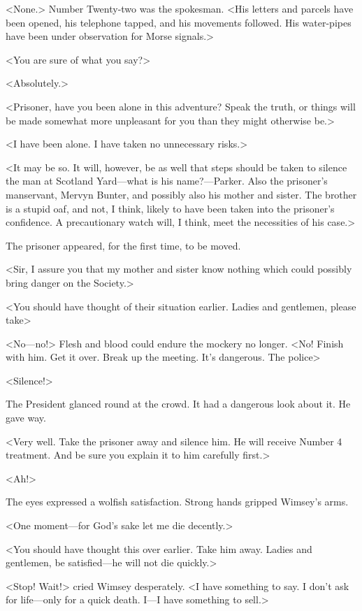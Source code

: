 <None.> Number Twenty-two was the spokesman. <His letters and parcels have been opened, his telephone tapped, and his movements followed. His water-pipes have been under observation for Morse signals.>

<You are sure of what you say?>

<Absolutely.>

<Prisoner, have you been alone in this adventure? Speak the truth, or things will be made somewhat more unpleasant for you than they might otherwise be.>

<I have been alone. I have taken no unnecessary risks.>

<It may be so. It will, however, be as well that steps should be taken to silence the man at Scotland Yard—what is his name?—Parker. Also the prisoner's manservant, Mervyn Bunter, and possibly also his mother and sister. The brother is a stupid oaf, and not, I think, likely to have been taken into the prisoner's confidence. A precautionary watch will, I think, meet the necessities of his case.>

The prisoner appeared, for the first time, to be moved.

<Sir, I assure you that my mother and sister know nothing which could possibly bring danger on the Society.>

<You should have thought of their situation earlier. Ladies and gentlemen, please take\longdash>

<No—no!> Flesh and blood could endure the mockery no longer. <No! Finish with him. Get it over. Break up the meeting. It's dangerous. The police\longdash>

<Silence!>

The President glanced round at the crowd. It had a dangerous look about it. He gave way.

<Very well. Take the prisoner away and silence him. He will receive Number 4 treatment. And be sure you explain it to him carefully first.>

<Ah!>

The eyes expressed a wolfish satisfaction. Strong hands gripped Wimsey's arms.

<One moment—for God's sake let me die decently.>

<You should have thought this over earlier. Take him away. Ladies and gentlemen, be satisfied—he will not die quickly.>

<Stop! Wait!> cried Wimsey desperately. <I have something to say. I don't ask for life—only for a quick death. I—I have something to sell.>

